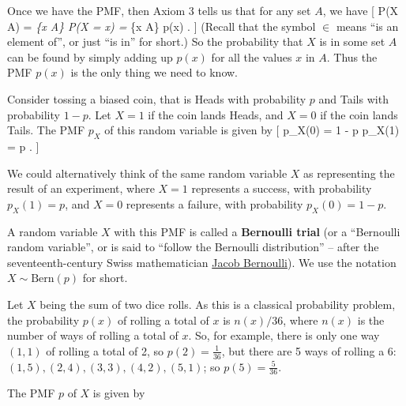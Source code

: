 \documentclass[
  letterpaper,
  DIV=11,
  numbers=noendperiod]{scrreprt}
\theoremstyle{remark}
\begin{document}
Once we have the PMF, then Axiom 3 tells us that for any set \(A\), we
have {[} \mathbb P(X \in A) = \sum\emph{\{x \in A\} \mathbb P(X = x) =
\sum}\{x \in A\} p(x) . {]} (Recall that the symbol \(\in\) means ``is
an element of'', or just ``is in'' for short.) So the probability that
\(X\) is in some set \(A\) can be found by simply adding up \(p(x)\) for
all the values \(x\) in \(A\). Thus the PMF \(p(x)\) is the only thing
we need to know.

Consider tossing a biased coin, that is Heads with probability \(p\) and
Tails with probability \(1-p\). Let \(X = 1\) if the coin lands Heads,
and \(X = 0\) if the coin lands Tails. The PMF \(p_X\) of this random
variable is given by {[} p\_X(0) = 1 - p \qquad p\_X(1) = p . {]}

We could alternatively think of the same random variable \(X\) as
representing the result of an experiment, where \(X = 1\) represents a
success, with probability \(p_X(1) = p\), and \(X = 0\) represents a
failure, with probability \(p_X(0) = 1 - p\).

A random variable \(X\) with this PMF is called a \textbf{Bernoulli
trial} (or a ``Bernoulli random variable'', or is said to ``follow the
Bernoulli distribution'' -- after the seventeenth-century Swiss
mathematician
\href{https://mathshistory.st-andrews.ac.uk/Biographies/Bernoulli_Jacob/}{Jacob
Bernoulli}). We use the notation \(X \sim \text{Bern}(p)\) for short.

Let \(X\) being the sum of two dice rolls. As this is a classical
probability problem, the probability \(p(x)\) of rolling a total of
\(x\) is \(n(x) / 36\), where \(n(x)\) is the number of ways of rolling
a total of \(x\). So, for example, there is only one way \((1,1)\) of
rolling a total of 2, so \(p(2) = \frac1{36}\), but there are 5 ways of
rolling a 6: \((1,5), (2,4), (3, 3), (4, 2), (5, 1)\); so
\(p(5) = \frac5{36}\).

The PMF \(p\) of \(X\) is given by
\end{document}
